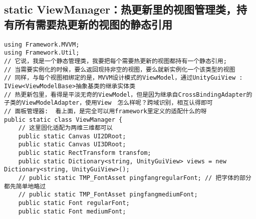 \documentclass[9pt, b5paper]{article}
\begin{document}
\subsection{static ViewManager：热更新里的视图管理类，持有所有需要热更新的视图的静态引用}
\label{sec-3-3}
\begin{verbatim}
using Framework.MVVM;
using Framework.Util;
// 它说，我是一个静态管理类，我要把每个需要热更新的视图都持有一个静态引用;
// 当需要实例化的时候，要么返回现持非空的视图，要么就新实例化一个该类型的视图
// 同样，与每个视图相绑定的是，MVVM设计模式的ViewModel，通过UnityGuiView : IView<ViewModelBase>抽象基类的继承实体类
// 热更新包里，看得是平淡无奇的ViewModel，但是因为继承自CrossBindingAdapter的子类的ViewModelAdapter，使用View　怎么样呢？跨域识别，相互认得即可
// 面板管理器:  看上面，是完全可以用framework里定义的适配什么的呀
public static class ViewManager {
    // 这里固化适配为两维三维都可以
    public static Canvas UI2DRoot;
    public static Canvas UI3DRoot;
    public static RectTransform transfom;
    public static Dictionary<string, UnityGuiView> views = new Dictionary<string, UnityGuiView>();
    // public static TMP_FontAsset pingfangregularFont; // 把字体的部分都先简单地略过
    // public static TMP_FontAsset pingfangmediumFont;
    public static Font regularFont;
    public static Font mediumFont;


\end{verbatim}
\end{document}
